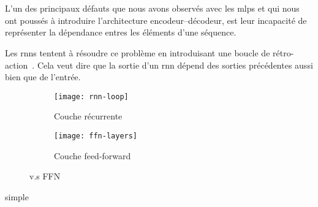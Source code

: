 \section{}
\label{sec.rnn}

L'un des principaux défauts que nous avons observés avec les \glspl{mlp} 
et qui nous ont poussés à introduire l'architecture encodeur--décodeur,
est leur incapacité de représenter la dépendance entres les éléments d'une séquence.

Les \glspl{rnn} tentent à résoudre ce problème en introduisant une boucle de rétro-action~\cite{Fathi_2021}.
Cela veut dire que la sortie d'un \gls{rnn} dépend des sorties précédentes aussi bien que de l'entrée.

\begin{figure}[hbt]
    \begin{center}
        \begin{subfigure}{.4\linewidth}
            \texttt{[image: rnn-loop]}
            \caption{Couche récurrente}
            \label{fig.rnn-loop}
        \end{subfigure}
        \begin{subfigure}{.4\linewidth}
            \texttt{[image: ffn-layers]}
            \caption{Couche feed-forward}
            \label{ffn-layer}
        \end{subfigure}
    \end{center}
    \caption{ v.s FFN}
\end{figure}

{simple}
